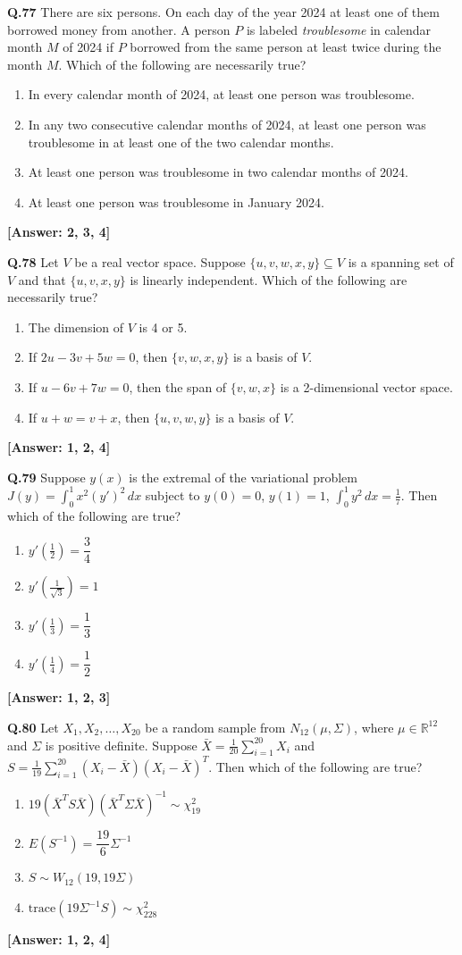 \documentclass[12pt,a4paper]{article}
\newcommand{\ans}[1]{\quad\textcolor{anscolor}{\textbf{[Answer: #1]}}}
\begin{document}
\textbf{Q.77} There are six persons. On each day of the year 2024 at least one of them borrowed money from another. A person $P$ is labeled \textit{troublesome} in calendar month $M$ of 2024 if $P$ borrowed from the same person at least twice during the month $M$. Which of the following are necessarily true?
\begin{enumerate}[label=\arabic*.]
\item In every calendar month of 2024, at least one person was troublesome.
\item In any two consecutive calendar months of 2024, at least one person was troublesome in at least one of the two calendar months.
\item At least one person was troublesome in two calendar months of 2024.
\item At least one person was troublesome in January 2024.
\end{enumerate}\ans{2, 3, 4}

\textbf{Q.78} Let $V$ be a real vector space. Suppose $\{u,v,w,x,y\}\subseteq V$ is a spanning set of $V$ and that $\{u,v,x,y\}$ is linearly independent. Which of the following are necessarily true?
\begin{enumerate}[label=\arabic*.]
\item The dimension of $V$ is 4 or 5.
\item If $2u-3v+5w=0$, then $\{v,w,x,y\}$ is a basis of $V$.
\item If $u-6v+7w=0$, then the span of $\{v,w,x\}$ is a 2-dimensional vector space.
\item If $u+w=v+x$, then $\{u,v,w,y\}$ is a basis of $V$.
\end{enumerate}\ans{1, 2, 4}

\textbf{Q.79} Suppose $y(x)$ is the extremal of the variational problem $J(y)=\int_0^1x^2(y')^2\,dx$ subject to $y(0)=0$, $y(1)=1$, $\int_0^1y^2\,dx=\tfrac{1}{7}$. Then which of the following are true?
\begin{enumerate}[label=\arabic*.]
\item $y'\!\left(\tfrac{1}{2}\right)=\dfrac{3}{4}$
\item $y'\!\left(\tfrac{1}{\sqrt{3}}\right)=1$
\item $y'\!\left(\tfrac{1}{3}\right)=\dfrac{1}{3}$
\item $y'\!\left(\tfrac{1}{4}\right)=\dfrac{1}{2}$
\end{enumerate}\ans{1, 2, 3}

\textbf{Q.80} Let $X_1,X_2,\ldots,X_{20}$ be a random sample from $N_{12}(\mu,\Sigma)$, where $\mu\in\mathbb{R}^{12}$ and $\Sigma$ is positive definite. Suppose $\bar{X}=\tfrac{1}{20}\sum_{i=1}^{20}X_i$ and $S=\tfrac{1}{19}\sum_{i=1}^{20}(X_i-\bar{X})(X_i-\bar{X})^T$. Then which of the following are true?
\begin{enumerate}[label=\arabic*.]
\item $19(\bar{X}^TS\bar{X})(\bar{X}^T\Sigma\bar{X})^{-1}\sim\chi^2_{19}$
\item $E(S^{-1})=\dfrac{19}{6}\Sigma^{-1}$
\item $S\sim W_{12}(19,19\Sigma)$
\item $\text{trace}(19\Sigma^{-1}S)\sim\chi^2_{228}$
\end{enumerate}\ans{1, 2, 4}
\end{document}
